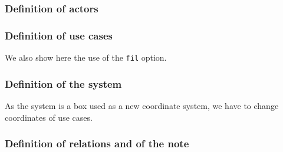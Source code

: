 \documentclass[a4paper,11pt]{report}
\newcommand{\inputTikZ}[1]{%
  }%
\newcommand{\inputTikZ}[1]{%
    \texttt{[image: fig/\#1.pdf]}%
  }%
\begin{document}
\subsubsection{Definition of actors}

{\color{red!70!black}

}

\begin{center}
\inputTikZ{usecasediagstep1}
\end{center}

\subsubsection{Definition of use cases}

We also show here the use of the {\tt fil} option.

{\color{red!70!black}
\vspace{-0.4cm}
}


\begin{center}
\inputTikZ{usecasediagstep2}
\end{center}

\subsubsection{Definition of the system}

As the system is a box used as a new coordinate system, we have to change coordinates of use cases.

{\color{red!70!black}
\vspace{-0.4cm}
}
\vspace{-0.4cm}
{\color{red!70!black}
\vspace{-0.4cm}
}


\begin{center}
\inputTikZ{usecasediagstep3}
\end{center}

\subsubsection{Definition of relations and of the note}
\end{document}
